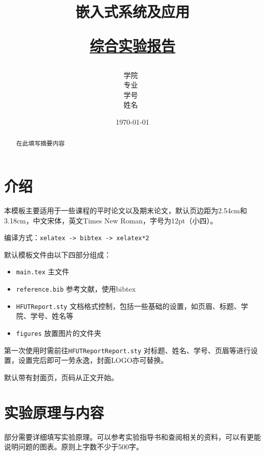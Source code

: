 \documentclass[12pt,hyperref,a4paper,UTF8]{ctexart}
\title{ 
        \vspace{1cm}
        \heiti \Huge \textbf{{嵌入式系统及应用}} \par
        \vspace{1cm} 
        \heiti \Large {\underline{综合实验报告}}    
        \vspace{3cm}
    }
\author{
        \vspace{0.5cm}
        \kaishu\Large 学院\ \dlmu[9cm]{仪器科学与光电工程学院} \\ %
        \vspace{0.5cm}
        \kaishu\Large 专业\ \dlmu[9cm]{光电信息工程} \\ %
        \vspace{0.5cm}
        \kaishu\Large 学号\ \dlmu[9cm]{2024XXXXXX} \qquad  \\ %
        \vspace{0.5cm}
        \kaishu\Large 姓名\ \dlmu[9cm]{XXX} \qquad \\ %
    }
\date{\today} %
\begin{document}
\cover
\thispagestyle{empty} %
\newpage
\begin{abstract}

在此填写摘要内容

\end{abstract}

\thispagestyle{empty} %

\newpage
\tableofcontents

\newpage
\setcounter{page}{1} %


\section{介绍}
本模板主要适用于一些课程的平时论文以及期末论文，默认页边距为2.54cm和3.18cm，中文宋体，英文Times New Roman，字号为12pt（小四）。

编译方式：\verb|xelatex -> bibtex -> xelatex*2|


默认模板文件由以下四部分组成：
\begin{itemize}
    \item \texttt{main.tex} 主文件
    \item \texttt{reference.bib} 参考文献，使用bibtex
    \item \texttt{HFUTReport.sty} 文档格式控制，包括一些基础的设置，如页眉、标题、学院、学号、姓名等
    \item \texttt{figures} 放置图片的文件夹
\end{itemize}

第一次使用时需前往\texttt{HFUTReportReport.sty} 对标题、姓名、学号、页眉等进行设置，设置完后即可一劳永逸，封面LOGO亦可替换。

默认带有封面页，页码从正文开始。

\section{实验原理与内容}

部分需要详细填写实验原理。可以参考实验指导书和查阅相关的资料，可以有更能说明问题的图表。原则上字数不少于500字。
\end{document}
